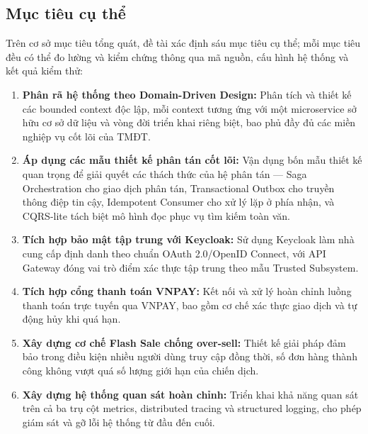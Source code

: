 \documentclass[../DoAn.tex]{subfiles}
\begin{document}
\subsection*{Mục tiêu cụ thể}

Trên cơ sở mục tiêu tổng quát, đề tài xác định sáu mục tiêu cụ thể; mỗi mục tiêu đều có thể
đo lường và kiểm chứng thông qua mã nguồn, cấu hình hệ thống và kết quả kiểm thử:

\begin{enumerate}
    \item \textbf{Phân rã hệ thống theo Domain-Driven Design:} Phân tích và thiết kế các
    bounded context độc lập, mỗi context tương ứng với một microservice sở hữu cơ sở dữ liệu
    và vòng đời triển khai riêng biệt, bao phủ đầy đủ các miền nghiệp vụ cốt lõi của TMĐT.

    \item \textbf{Áp dụng các mẫu thiết kế phân tán cốt lõi:} Vận dụng bốn mẫu thiết kế quan
    trọng để giải quyết các thách thức của hệ phân tán --- Saga Orchestration cho giao dịch
    phân tán, Transactional Outbox cho truyền thông điệp tin cậy, Idempotent Consumer cho xử
    lý lặp ở phía nhận, và CQRS-lite tách biệt mô hình đọc phục vụ tìm kiếm toàn văn.

    \item \textbf{Tích hợp bảo mật tập trung với Keycloak:} Sử dụng Keycloak làm nhà cung cấp
    định danh theo chuẩn OAuth 2.0/OpenID Connect, với API Gateway đóng vai trò điểm xác thực
    tập trung theo mẫu Trusted Subsystem.

    \item \textbf{Tích hợp cổng thanh toán VNPAY:} Kết nối và xử lý hoàn chỉnh luồng thanh
    toán trực tuyến qua VNPAY, bao gồm cơ chế xác thực giao dịch và tự động hủy khi quá hạn.

    \item \textbf{Xây dựng cơ chế Flash Sale chống over-sell:} Thiết kế giải pháp đảm bảo
    trong điều kiện nhiều người dùng truy cập đồng thời, số đơn hàng thành công không vượt
    quá số lượng giới hạn của chiến dịch.

    \item \textbf{Xây dựng hệ thống quan sát hoàn chỉnh:} Triển khai khả năng quan sát trên
    cả ba trụ cột metrics, distributed tracing và structured logging, cho phép giám sát và
    gỡ lỗi hệ thống từ đầu đến cuối.
\end{enumerate}
\end{document}
